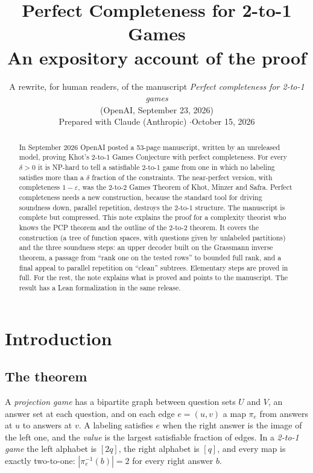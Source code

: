 \documentclass[11pt]{article}
\title{\textbf{Perfect Completeness for 2-to-1 Games}\\[4pt]
\large An expository account of the proof}
\author{A rewrite, for human readers, of the manuscript
\emph{Perfect completeness for 2-to-1 games}\\
(OpenAI, September 23, 2026)\\[6pt]
\small Prepared with Claude (Anthropic) \quad$\cdot$\quad October 15, 2026}
\date{}
\theoremstyle{definition}
\theoremstyle{remark}
\newcommand{\eps}{\varepsilon}
\begin{document}
\maketitle

\begin{abstract}
\noindent
In September 2026 OpenAI posted a 53-page manuscript, written by an
unreleased model, proving Khot's 2-to-1 Games Conjecture with perfect
completeness. For every $\delta>0$ it is NP-hard to tell a satisfiable 2-to-1
game from one in which no labeling satisfies more than a $\delta$ fraction of
the constraints. The near-perfect version, with completeness $1-\eps$, was the
2-to-2 Games Theorem of Khot, Minzer and Safra. Perfect completeness needs a
new construction, because the standard tool for driving soundness down,
parallel repetition, destroys the 2-to-1 structure. The manuscript is complete
but compressed. This note explains the proof for a complexity theorist who
knows the PCP theorem and the outline of the 2-to-2 theorem. It covers the
construction (a tree of function spaces, with questions given by unlabeled
partitions) and the three soundness steps: an upper decoder built on the
Grassmann inverse theorem, a passage from ``rank one on the tested rows'' to
bounded full rank, and a final appeal to parallel repetition on ``clean''
subtrees. Elementary steps are proved in full. For the rest, the note explains
what is proved and points to the manuscript. The result has a Lean
formalization in the same release.
\end{abstract}

{\small\setlength{\parskip}{0pt}\tableofcontents}
\clearpage

\section{Introduction}\label{sec:intro}

\subsection{The theorem}

A \emph{projection game} has a bipartite graph between question sets $U$ and
$V$, an answer set at each question, and on each edge $e=(u,v)$ a map $\pi_e$
from answers at $u$ to answers at $v$. A labeling satisfies $e$ when the right
answer is the image of the left one, and the \emph{value} is the largest
satisfiable fraction of edges. In a \emph{2-to-1 game} the left alphabet is
$[2q]$, the right alphabet is $[q]$, and every map is exactly two-to-one:
$|\pi_e^{-1}(b)|=2$ for every right answer $b$.
\end{document}
